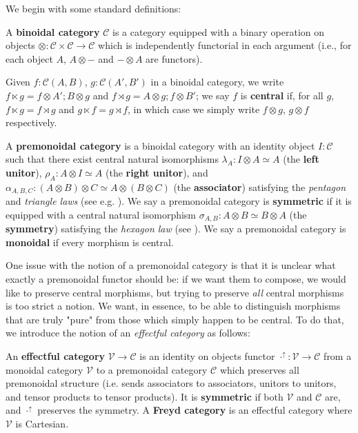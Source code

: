 \documentclass[acmsmall,screen,review]{acmart}
\newcommand{\mc}[1]{\ensuremath{\mathcal{#1}}}
\newcommand{\upg}[2]{{#1}^{\uparrow #2}}
\begin{document}
We begin with some standard definitions:
\begin{definition} 
  A \textbf{binoidal category} \(\mc{C}\) is a category equipped with a binary
  operation on objects \(\otimes: \mc{C} \times \mc{C} \to \mc{C}\) which is
  independently functorial in each argument (i.e., for each object \(A\), \(A
  \otimes -\) and \(- \otimes A\) are functors).
\end{definition}
Given \(f: \mc{C}(A, B)\), \(g: \mc{C}(A', B')\) in a binoidal category, we
write \(f \ltimes g = f \otimes A';B \otimes g\) and \(f \rtimes g = A \otimes
g;f \otimes B'\); we say \(f\) is \textbf{central} if, for all \(g\), \(f
\ltimes g = f \rtimes g\) and \(g \ltimes f = g \rtimes f\), in which case we
simply write \(f \otimes g\), \(g \otimes f\) respectively.
\begin{definition} 
  A \textbf{premonoidal category} is a binoidal category with an identity object
  \(I: \mc{C}\) such that there exist central natural isomorphisms \(\lambda_A:
  I \otimes A \simeq A\) (the \textbf{left unitor}), \(\rho_A: A \otimes I
  \simeq A\) (the \textbf{right unitor}), and \(\alpha_{A, B, C}: (A \otimes B)
  \otimes C \simeq A \otimes (B \otimes C)\) (the \textbf{associator})
  satisfying the \textit{pentagon} and \textit{triangle laws} (see e.g.
  \citet{maclane:71}). We say a premonoidal category is \textbf{symmetric} if it
  is equipped with a central natural isomorphism \(\sigma_{A, B}: A \otimes B
  \simeq B \otimes A\) (the \textbf{symmetry}) satisfying the \textit{hexagon
  law} (see \cite{maclane:71}). We say a premonoidal category is
  \textbf{monoidal} if every morphism is central.
\end{definition}
One issue with the notion of a premonoidal category is that it is unclear what
exactly a premonoidal functor should be: if we want them to compose, we would
like to preserve central morphisms, but trying to preserve \textit{all} central
morphisms is too strict a notion. We want, in essence, to be able to distinguish
morphisms that are truly "pure" from those which simply happen to be central. To
do that, we introduce the notion of an \textit{effectful category} as follows:
\begin{definition} 
  An \textbf{effectful category} \(\mc{V} \to \mc{C}\) is an identity on objects
  functor \(\upg{\cdot}{}: \mc{V} \to \mc{C}\) from a monoidal category
  \(\mc{V}\) to a premonoidal category \(\mc{C}\) which preserves all
  premonoidal structure (i.e. sends associators to associators, unitors to
  unitors, and tensor products to tensor products). It is \textbf{symmetric} if
  both \(\mc{V}\) and \(\mc{C}\) are, and \(\upg{\cdot}{}\) preserves the
  symmetry. A \textbf{Freyd category} is an effectful category where \(\mc{V}\)
  is Cartesian.
\end{definition}
\end{document}
